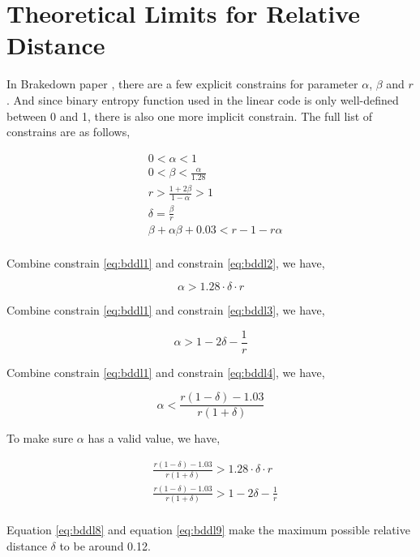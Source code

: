 \section{Theoretical Limits for Relative Distance}

In Brakedown paper \cite{brakedown}, there are a few explicit constrains for parameter $\alpha$, $\beta$ and $r$. And since binary entropy function used in the linear code is only well-defined between 0 and 1, there is also one more implicit constrain. The full list of constrains are as follows,

\begin{align}
& 0 < \alpha < 1 \nonumber \\
& 0 < \beta < \frac{\alpha}{1.28} \label{eq:bddl2} \\
& r > \frac{1 + 2\beta}{1 - \alpha} > 1 \label{eq:bddl3} \\
& \delta = \frac{\beta}{r} \label{eq:bddl1} \\
& \beta + \alpha\beta + 0.03 < r - 1 - r\alpha \label{eq:bddl4} \\
\end{align}

Combine constrain \ref{eq:bddl1} and constrain \ref{eq:bddl2}, we have,

\begin{equation}
\label{eq:bddl5}
    \alpha > 1.28 \cdot \delta \cdot r 
\end{equation}
    

Combine constrain \ref{eq:bddl1} and constrain \ref{eq:bddl3}, we have,

\begin{equation}
\label{eq:bddl6}
    \alpha > 1 - 2\delta - \frac{1}{r} 
\end{equation}


Combine constrain \ref{eq:bddl1} and constrain \ref{eq:bddl4}, we have,

\begin{equation}
\label{eq:bddl7}
    \alpha < \frac{r(1 - \delta) - 1.03}{r(1 + \delta)}
\end{equation}

To make sure $\alpha$ has a valid value, we have,

\begin{align}
& \frac{r(1 - \delta) - 1.03}{r(1 + \delta)} > 1.28 \cdot \delta \cdot r \label{eq:bddl8} \\
& \frac{r(1 - \delta) - 1.03}{r(1 + \delta)} > 1 - 2\delta - \frac{1}{r}  \label{eq:bddl9} \\
\end{align}

Equation \ref{eq:bddl8} and equation \ref{eq:bddl9} make the maximum possible relative distance $\delta$ to be around 0.12.